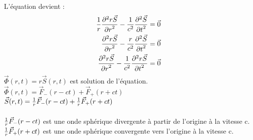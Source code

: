 \documentclass[11pt,a4paper,french]{article}
\begin{document}
\paragraph{}
L'équation devient :
\begin{align*}
{1 \over r}{\partial^2 r \vec S \over {\partial r}^2} - {1 \over c^2}{\partial^2 \vec S \over {\partial t}^2} &= \vec 0 \\
{\partial^2 r \vec S \over {\partial r}^2} - {r \over c^2}{\partial^2 \vec S \over {\partial t}^2} &= \vec 0 \\
{\partial^2 r \vec S \over {\partial r}^2} - {1 \over c^2}{\partial^2 r\vec S \over {\partial t}^2} &= \vec 0 \\
\end{align*}
$\vec \Phi(r, t) = r \vec S(r, t)$ est solution de l'équation. \\
$\vec \Phi(r, t) = \vec F_- (r-ct) + \vec F_+ (r+ct)$ \\
$\vec S(r, t) = {1 \over r}\vec F_- (r-ct) + {1 \over r} \vec F_+ (r+ct)$ \\ \\
${1 \over r}\vec F_- (r-ct)$ est une onde sphérique divergente à partir de l'origine à la vitesse c. \\
${1 \over r} \vec F_+ (r+ct)$ est une onde sphérique convergente vers l'origine à la vitesse c. \\
\end{document}
